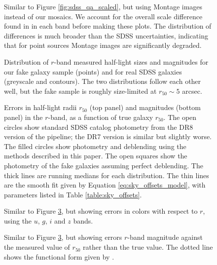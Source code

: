 \clearpage
{}
\begin{figure}
\figurenum{\fignum}
\caption{\label{fig:montage_qa_scaled} Similar to Figure
\ref{fig:sdss_qa_scaled}, but using Montage images instead of our
mosaics. We account for the overall scale difference found in in each band
before making these plots. The distribution of differences is much
broader than the SDSS uncertainties, indicating that for point sources
Montage images are significantly degraded.}
\end{figure}

\clearpage
{}
\begin{figure}
\figurenum{\fignum}
\caption{\label{fig:fakedist} Distribution of $r$-band measured
  half-light sizes and magnitudes for our fake galaxy sample (points)
  and for real SDSS galaxies (greyscale and contours). The two
  distributions follow each other well, but the fake sample is roughly
  size-limited at $r_{50} \sim 5$ arcsec.}
\end{figure}

\clearpage
{}
\begin{figure}
\figurenum{\fignum}
\caption{\label{fig:sky_offsets_ronly} Errors in half-light radii $r_{50}$
  (top panel) and magnitudes (bottom panel) in the $r$-band, as a
  function of true galaxy $r_{50}$. The open circles show standard
  SDSS catalog photometry from the DR8 version of the pipeline; the
  DR7 version is similar but slightly worse. The filled circles show
  photometry and deblending using the methods described in this paper.
  The open squares show the photometry of the fake galaxies assuming
  perfect deblending.  The thick lines are running medians for each
  distribution. The thin lines are the smooth fit given by Equation
  \ref{eq:sky_offsets_model}, with parameters listed in Table
  \ref{table:sky_offsets}.}
\end{figure}

\clearpage
{}
\begin{figure}
\figurenum{\fignum}
\caption{\label{fig:sky_offsets_ugiz} Similar to Figure
  \ref{fig:sky_offsets_ronly}, but showing errors in colors with respect to
  $r$, using the $u$, $g$, $i$ and $z$ bands.}
\end{figure}

\clearpage
{}
\begin{figure}
\figurenum{\fignum}
\caption{\label{fig:sky_offsets_vs_r50meas} Similar to Figure
  \ref{fig:sky_offsets_ronly}, but showing errors $r$-band magnitude against
  the measured value of $r_{50}$ rather than the true value. The
  dotted line shows the functional form given by \citet{hyde09a}.}
\end{figure}

